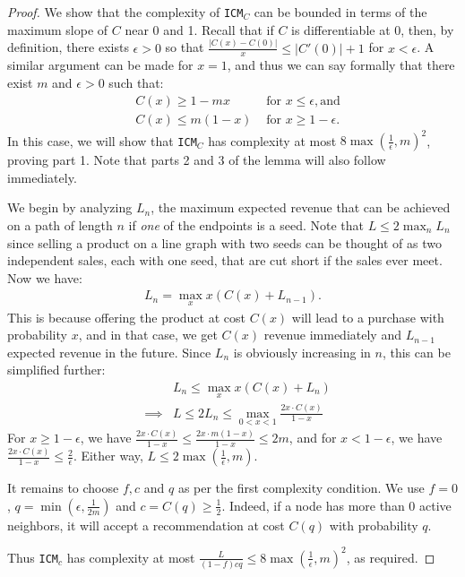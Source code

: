 \documentclass[letterpaper,twoside]{article}
\newcommand{\ICM}[1]{\texttt{ICM}$_{#1}$}
\begin{document}
\begin{proof}
    We show that the complexity of \ICM{C} can be bounded in terms
    of the maximum slope of $C$ near 0 and 1. Recall that if $C$ is
    differentiable at 0, then, by definition, there exists $\epsilon
    > 0$ so that
    $\frac{|C(x) - C(0)|}{x} \le |C'(0)| + 1$ for $x < \epsilon$. A similar
    argument can be made for $x = 1$, and thus we can say formally that
    there exist $m$ and $\epsilon>0$ such that:
    \begin{eqnarray*}
        &C(x) \ge 1 - mx& \textrm{ for } x \le \epsilon, \textrm{and}\\
        &C(x) \le m(1 - x)& \textrm{ for } x \ge 1-\epsilon.
    \end{eqnarray*}
    In this case, we will show that \ICM{C} has complexity at most
    $8\max(\frac{1}{\epsilon}, m)^2$, proving part 1. Note that parts 2 and 3 of the lemma will also follow
    immediately.

    We begin by analyzing $L_n$, the maximum expected revenue that
    can be achieved on a path of length $n$ if {\em one} of the
    endpoints is a seed. Note that $L \le 2\max_n L_n$ since selling a
    product on a line graph with two seeds can be thought of as
    two independent sales, each with one seed, that are cut short if
    the sales ever meet. Now we have:
    \begin{eqnarray*}
        L_n = \max_x x(C(x) + L_{n-1}).
    \end{eqnarray*}
    This is because offering the product at cost $C(x)$ will lead to
    a purchase with probability $x$, and in that case, we get $C(x)$
    revenue immediately and $L_{n-1}$ expected revenue in the future.
    Since $L_n$ is obviously increasing in $n$,
    this can be simplified further:
    \begin{eqnarray*}
        && L_n \le \max_x x(C(x) + L_n)\\
        &\implies&
        L \le 2L_n \le \max_{0<x<1} \frac{2x \cdot C(x)}{1-x}
    \end{eqnarray*}
    For $x \ge 1-\epsilon$, we have $\frac{2x \cdot
    C(x)}{1-x} \le \frac{2x \cdot m(1-x)}{1-x} \le 2m$, and for
  $x < 1 - \epsilon$, we have $\frac{2x \cdot C(x)}{1-x} \le
    \frac{2}{\epsilon}$. Either way,
    $L \le 2\max(\frac{1}{\epsilon}, m)$.

    It remains to choose $f, c$ and $q$ as per the first complexity
    condition. We use $f = 0$, $q = \min(\epsilon, \frac{1}{2m})$
    and $c = C(q) \ge \frac{1}{2}$. Indeed, if a node has more than
    0 active neighbors, it will accept a recommendation at cost
    $C(q)$ with probability $q$.

    Thus \ICM{c} has complexity at most $\frac{L}{(1-f)cq} \le
    8\max(\frac{1}{\epsilon}, m)^2$, as required.
\end{proof}
\end{document}
